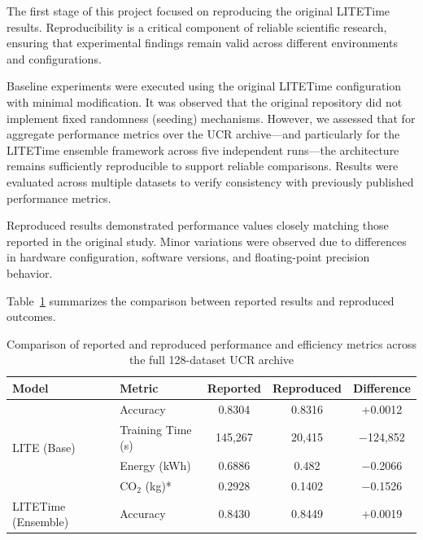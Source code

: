 \documentclass[conference]{IEEEtran}
\begin{document}
The first stage of this project focused on reproducing the original LITETime results. Reproducibility is a critical component of reliable scientific research, ensuring that experimental findings remain valid across different environments and configurations.

Baseline experiments were executed using the original LITETime configuration with minimal modification. It was observed that the original repository did not implement fixed randomness (seeding) mechanisms. However, we assessed that for aggregate performance metrics over the UCR archive—and particularly for the LITETime ensemble framework across five independent runs—the architecture remains sufficiently reproducible to support reliable comparisons. Results were evaluated across multiple datasets to verify consistency with previously published performance metrics.

Reproduced results demonstrated performance values closely matching those reported in the original study. Minor variations were observed due to differences in hardware configuration, software versions, and floating-point precision behavior.

Table~\ref{tab:repro_results} summarizes the comparison between reported results and reproduced outcomes.

\begin{table}[h]
    \centering
    \caption{Comparison of reported and reproduced performance and efficiency metrics across the full 128-dataset UCR archive}
    \label{tab:repro_results}
    \begin{tabular}{llccc}
        \toprule
        Model                        & Metric            & Reported & Reproduced & Difference \\
        \midrule
        \multirow{4}{*}{LITE (Base)} & Accuracy          & 0.8304   & 0.8316     & +0.0012    \\
                                     & Training Time (s) & 145,267  & 20,415     & $-$124,852 \\
                                     & Energy (kWh)      & 0.6886   & 0.482      & $-$0.2066  \\
                                     & CO$_2$ (kg)*      & 0.2928   & 0.1402     & $-$0.1526  \\
        \midrule
        LITETime (Ensemble)          & Accuracy          & 0.8430   & 0.8449     & +0.0019    \\
        \bottomrule
    \end{tabular}
\end{table}
\end{document}
